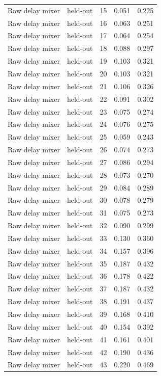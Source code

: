 \begin{tabular}{llrrr}
Raw delay mixer & held-out & 15 & 0.051 & 0.225 \\
Raw delay mixer & held-out & 16 & 0.063 & 0.251 \\
Raw delay mixer & held-out & 17 & 0.064 & 0.254 \\
Raw delay mixer & held-out & 18 & 0.088 & 0.297 \\
Raw delay mixer & held-out & 19 & 0.103 & 0.321 \\
Raw delay mixer & held-out & 20 & 0.103 & 0.321 \\
Raw delay mixer & held-out & 21 & 0.106 & 0.326 \\
Raw delay mixer & held-out & 22 & 0.091 & 0.302 \\
Raw delay mixer & held-out & 23 & 0.075 & 0.274 \\
Raw delay mixer & held-out & 24 & 0.076 & 0.275 \\
Raw delay mixer & held-out & 25 & 0.059 & 0.243 \\
Raw delay mixer & held-out & 26 & 0.074 & 0.273 \\
Raw delay mixer & held-out & 27 & 0.086 & 0.294 \\
Raw delay mixer & held-out & 28 & 0.073 & 0.270 \\
Raw delay mixer & held-out & 29 & 0.084 & 0.289 \\
Raw delay mixer & held-out & 30 & 0.078 & 0.279 \\
Raw delay mixer & held-out & 31 & 0.075 & 0.273 \\
Raw delay mixer & held-out & 32 & 0.090 & 0.299 \\
Raw delay mixer & held-out & 33 & 0.130 & 0.360 \\
Raw delay mixer & held-out & 34 & 0.157 & 0.396 \\
Raw delay mixer & held-out & 35 & 0.187 & 0.432 \\
Raw delay mixer & held-out & 36 & 0.178 & 0.422 \\
Raw delay mixer & held-out & 37 & 0.187 & 0.432 \\
Raw delay mixer & held-out & 38 & 0.191 & 0.437 \\
Raw delay mixer & held-out & 39 & 0.168 & 0.410 \\
Raw delay mixer & held-out & 40 & 0.154 & 0.392 \\
Raw delay mixer & held-out & 41 & 0.161 & 0.401 \\
Raw delay mixer & held-out & 42 & 0.190 & 0.436 \\
Raw delay mixer & held-out & 43 & 0.220 & 0.469 \\

\end{tabular}
